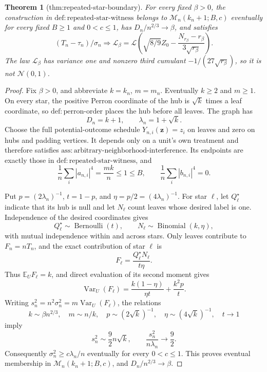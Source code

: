 \documentclass{article}
\newtheorem{theorem}{Theorem}
\begin{document}
\begin{theorem}[thm:repeated-star-boundary]\label{thm:repeated-star-boundary}
For every fixed \(\beta>0\), the construction in \(\mathrm{def:repeated\text{-}star\text{-}witness}\) belongs to \(\mathcal M_n(k_n+1;B,c)\) eventually for every fixed \(B\ge1\) and \(0<c\le1\), has \(D_n/n^{2/3}\to\beta\), and satisfies \[(T_n-\tau_n)/\sigma_n\Rightarrow\mathcal L_{\beta}=\mathcal L\left(\sqrt{8/9}Z_0-\frac{N_{r_{\beta}}-r_{\beta}}{3\sqrt{r_{\beta}}}\right).\] The law \(\mathcal L_{\beta}\) has variance one and nonzero third cumulant \(-1/(27\sqrt{r_{\beta}})\), so it is not \(\mathcal N(0,1)\).
\end{theorem}
\begin{proof}
Fix \(\beta>0\), and abbreviate \(k=k_n\), \(m=m_n\).  Eventually \(k\ge2\) and \(m\ge1\).  On every star, the positive Perron coordinate of the hub is \(\sqrt{k}\) times a leaf coordinate, so \(\mathrm{def:perron\text{-}order}\) places the hub before all leaves.  The graph has
\[
 D_n=k+1,\qquad \lambda_n=1+\sqrt{k}.
\]
Choose the full potential-outcome schedule \(Y_{n,i}(\mathbf z)=z_i\) on leaves and zero on hubs and padding vertices.  It depends only on a unit's own treatment and therefore satisfies \(\mathrm{ass:arbitrary\text{-}neighborhood\text{-}interference}\).  Its endpoints are exactly those in \(\mathrm{def:repeated\text{-}star\text{-}witness}\), and
\[
 \frac1n\sum_i|a_{n,i}|^4=\frac{mk}{n}\le1\le B,\qquad
 \frac1n\sum_i|b_{n,i}|^4=0.
\]

Put \(p=(2\lambda_n)^{-1}\), \(t=1-p\), and \(\eta=p/2=(4\lambda_n)^{-1}\).  For star \(\ell\), let \(Q_\ell^\star\) indicate that its hub is null and let \(N_\ell\) count leaves whose desired label is one.  Independence of the desired coordinates gives
\[
 Q_\ell^\star\sim\operatorname{Bernoulli}(t),\qquad
 N_\ell\sim\operatorname{Binomial}(k,\eta),
\]
with mutual independence within and across stars.  Only leaves contribute to \(F_n=nT_n\), and the exact contribution of star \(\ell\) is
\[
 F_\ell=\frac{Q_\ell^\star N_\ell}{t\eta}.
\]
Thus \(\mathbb E_UF_\ell=k\), and direct evaluation of its second moment gives
\[
 \operatorname{Var}_U(F_\ell)
 =\frac{k(1-\eta)}{\eta t}+\frac{k^2p}{t}.
\]
Writing \(s_n^2=n^2\sigma_n^2=m\operatorname{Var}_U(F_\ell)\), the relations
\[
 k\sim\beta n^{2/3},\quad m\sim n/k,\quad
 p\sim(2\sqrt{k})^{-1},\quad\eta\sim(4\sqrt{k})^{-1},\quad t\to1
\]
imply
\[
 s_n^2\sim\frac92n\sqrt{k},\qquad
 \frac{s_n^2}{n\lambda_n}\longrightarrow\frac92.
\]
Consequently \(\sigma_n^2\ge c\lambda_n/n\) eventually for every \(0<c\le1\).  This proves eventual membership in \(\mathcal M_n(k_n+1;B,c)\), and \(D_n/n^{2/3}\to\beta\).


\end{proof}
\end{document}
